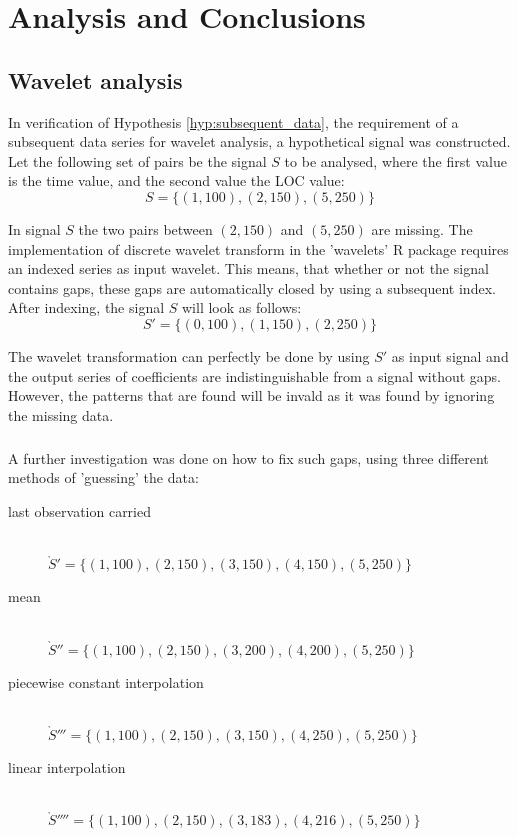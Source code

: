 \chapter{Analysis and Conclusions}
\label{analysis}

\section{Wavelet analysis}
In verification of Hypothesis \ref{hyp:subsequent_data}, the requirement of a
subsequent data series for wavelet analysis, a hypothetical signal was
constructed. Let the following set of pairs be the signal $S$ to be analysed,
where the first value is the time value, and the second value the LOC value:
$$S = \{(1,100), (2,150), (5,250)\}$$

\noindent
In signal $S$ the two pairs between $(2,150)$ and $(5,250)$ are missing. The
implementation of discrete wavelet transform in the 'wavelets' R package
requires an indexed series as input wavelet. This means, that whether or not
the signal contains gaps, these gaps are automatically closed by using a
subsequent index. After indexing, the signal $S$ will look as follows:
$$S' = \{(0,100), (1,150), (2,250)\}$$

\noindent
The wavelet transformation can perfectly be done by using $S'$ as input
signal and the output series of coefficients are indistinguishable from a
signal without gaps. However, the patterns that are found will be invald as it
was found by ignoring the missing data.

\paragraph{}
A further investigation was done on how to fix such gaps, using three different
methods of 'guessing' the data:
\begin{description}
	\item[last observation carried] \hfill \\[1em]
	$\grave{S}' = \{(1,100), (2,150), (3,150), (4,150), (5,250)\}$

	\item[mean] \hfill \\[1em]
	$\grave{S}'' = \{(1,100), (2,150), (3,200), (4,200), (5,250)\}$
	
	\item[piecewise constant interpolation] \hfill \\[1em]
	$\grave{S}''' = \{(1,100), (2,150), (3,150), (4,250), (5,250)\}$
	
	\item[linear interpolation] \hfill \\[1em]
	$\grave{S}'''' = \{(1,100), (2,150), (3,183), (4,216), (5,250)\}$
\end{description}

